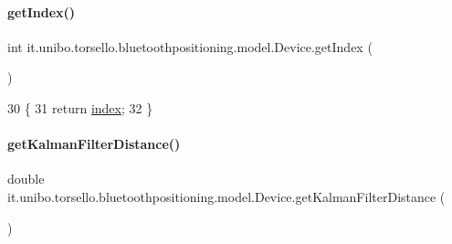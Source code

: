 \paragraph{\texorpdfstring{get\+Index()}{getIndex()}}
{\footnotesize\ttfamily int it.\+unibo.\+torsello.\+bluetoothpositioning.\+model.\+Device.\+get\+Index (\begin{DoxyParamCaption}{ }\end{DoxyParamCaption})}


\begin{DoxyCode}
30                           \{
31         \textcolor{keywordflow}{return} \hyperlink{classit_1_1unibo_1_1torsello_1_1bluetoothpositioning_1_1model_1_1Device_a55a01164b2388451f5e8344bfbc61ccc_a55a01164b2388451f5e8344bfbc61ccc}{index};
32     \}
\end{DoxyCode}
\hypertarget{classit_1_1unibo_1_1torsello_1_1bluetoothpositioning_1_1model_1_1Device_aa86454f965d50f015f1f40abe2d0d19a_aa86454f965d50f015f1f40abe2d0d19a}{}\label{classit_1_1unibo_1_1torsello_1_1bluetoothpositioning_1_1model_1_1Device_aa86454f965d50f015f1f40abe2d0d19a_aa86454f965d50f015f1f40abe2d0d19a} 
\paragraph{\texorpdfstring{get\+Kalman\+Filter\+Distance()}{getKalmanFilterDistance()}}
{\footnotesize\ttfamily double it.\+unibo.\+torsello.\+bluetoothpositioning.\+model.\+Device.\+get\+Kalman\+Filter\+Distance (\begin{DoxyParamCaption}{ }\end{DoxyParamCaption})}


